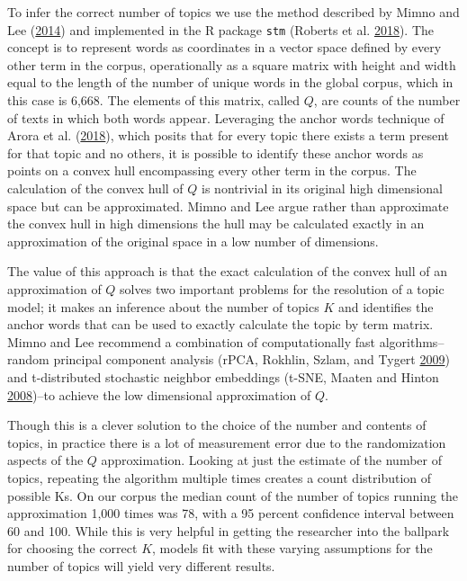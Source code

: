 \documentclass[]{book}
\theoremstyle{definition}
\theoremstyle{definition}
\theoremstyle{definition}
\theoremstyle{remark}
\begin{document}
To infer the correct number of topics we use the method described by
Mimno and Lee (\protect\hyperlink{ref-Mimno2014Lowdimensional}{2014})
and implemented in the R package \texttt{stm} (Roberts et al.
\protect\hyperlink{ref-Roberts2018stm}{2018}). The concept is to
represent words as coordinates in a vector space defined by every other
term in the corpus, operationally as a square matrix with height and
width equal to the length of the number of unique words in the global
corpus, which in this case is 6,668. The elements of this matrix, called
\(Q\), are counts of the number of texts in which both words appear.
Leveraging the anchor words technique of Arora et al.
(\protect\hyperlink{ref-Arora2018Learning}{2018}), which posits that for
every topic there exists a term present for that topic and no others, it
is possible to identify these anchor words as points on a convex hull
encompassing every other term in the corpus. The calculation of the
convex hull of \(Q\) is nontrivial in its original high dimensional
space but can be approximated. Mimno and Lee argue rather than
approximate the convex hull in high dimensions the hull may be
calculated exactly in an approximation of the original space in a low
number of dimensions.

The value of this approach is that the exact calculation of the convex
hull of an approximation of \(Q\) solves two important problems for the
resolution of a topic model; it makes an inference about the number of
topics \(K\) and identifies the anchor words that can be used to exactly
calculate the topic by term matrix. Mimno and Lee recommend a
combination of computationally fast algorithms--random principal
component analysis (rPCA, Rokhlin, Szlam, and Tygert
\protect\hyperlink{ref-Rokhlin2009Randomized}{2009}) and t-distributed
stochastic neighbor embeddings (t-SNE, Maaten and Hinton
\protect\hyperlink{ref-Maaten2008Visualizing}{2008})--to achieve the low
dimensional approximation of \(Q\).

Though this is a clever solution to the choice of the number and
contents of topics, in practice there is a lot of measurement error due
to the randomization aspects of the \(Q\) approximation. Looking at just
the estimate of the number of topics, repeating the algorithm multiple
times creates a count distribution of possible Ks. On our corpus the
median count of the number of topics running the approximation 1,000
times was 78, with a 95 percent confidence interval between 60 and 100.
While this is very helpful in getting the researcher into the ballpark
for choosing the correct \(K\), models fit with these varying
assumptions for the number of topics will yield very different results.
\end{document}
